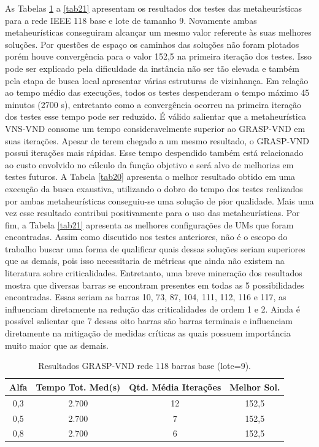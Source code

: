 \documentclass[12pt]{article}
\begin{document}
As Tabelas \ref{tab18} a \ref{tab21} apresentam os resultados dos testes das metaheurísticas para a rede IEEE 118 base e lote de tamanho 9. Novamente ambas metaheurísticas conseguiram alcançar um mesmo valor referente às suas melhores soluções. Por questões de espaço os caminhos das soluções não foram plotados porém houve convergência para o valor 152,5 na primeira iteração dos testes. Isso pode ser explicado pela dificuldade da instância não ser tão elevada e também pela etapa de busca local apresentar várias estruturas de vizinhança. Em relação ao tempo médio das execuções, todos os testes despenderam o tempo máximo 45 minutos (2700 s), entretanto como a convergência ocorreu na primeira iteração dos testes esse tempo pode ser reduzido. É válido salientar que a metaheurística VNS-VND consome um tempo consideravelmente superior ao GRASP-VND em suas iterações. Apesar de terem chegado a um mesmo resultado, o GRASP-VND possui iterações mais rápidas. Esse tempo despendido também está relacionado ao custo envolvido no cálculo da função objetivo e será alvo de melhorias em testes futuros. A Tabela \ref{tab20} apresenta o melhor resultado obtido em uma execução da busca exaustiva, utilizando o dobro do tempo dos testes realizados por ambas metaheurísticas conseguiu-se uma solução de pior qualidade. Mais uma vez esse resultado contribui positivamente para o uso das metaheurísticas. Por fim, a Tabela \ref{tab21} apresenta as melhores configurações de UMs que foram encontradas. Assim como discutido nos testes anteriores, não é o escopo do trabalho buscar uma forma de qualificar quais dessas soluções seriam superiores que as demais, pois isso necessitaria de métricas que ainda não existem na literatura sobre criticalidades. Entretanto, uma breve mineração dos resultados mostra que diversas barras se encontram presentes em todas as 5 possibilidades encontradas. Essas seriam as barras 10, 73, 87, 104, 111, 112, 116 e 117, as influenciam diretamente na redução das criticalidades de ordem 1 e 2. Ainda é possível salientar que 7 dessas oito barras são barras terminais e influenciam diretamente na mitigação de medidas críticas as quais possuem importância muito maior que as demais.


\begin{table}[H]
	\centering
	\caption{Resultados GRASP-VND rede 118 barras base (lote=9).}
	\begin{tabular}{|c|c|c|c|}
		\hline
		\textbf{Alfa} & \textbf{Tempo Tot. Med(s)} & \textbf{Qtd. Média Iterações} & \textbf{Melhor Sol.} \\
		\hline
		0,3   & 2.700 & 12    & 152,5 \\
		\hline
		0,5   & 2.700 & 7     & 152,5 \\
		\hline
		0,8   & 2.700 & 6     & 152,5 \\
		\hline
	\end{tabular}%
	\label{tab18}%
\end{table}%
\end{document}
